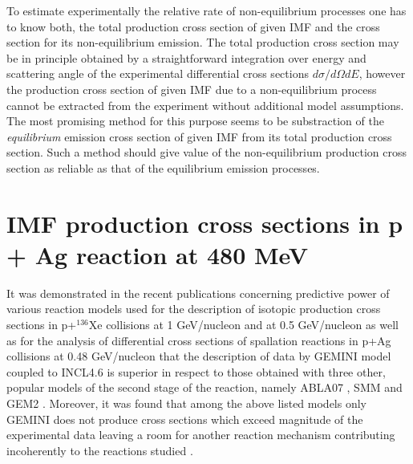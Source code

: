 To estimate experimentally the relative rate of non-equilibrium
processes one has to know both, the total production cross section
of given IMF and the cross section for its non-equilibrium emission.
The total production cross section may be in principle obtained by a
straightforward integration over energy and scattering angle of the
experimental differential cross sections $d\sigma/d\Omega dE$,
however the production cross section of given IMF due to a
non-equilibrium process cannot be extracted from the experiment
without additional model assumptions.  The most promising method for
this purpose seems to be substraction of the \emph{equilibrium}
emission cross section of given IMF  from its total production cross
section. Such a method should give value of the non-equilibrium
production cross section as reliable as that of the equilibrium
emission processes.  %
\section{IMF production cross sections in p + Ag reaction at 480 MeV}


It was demonstrated in the recent publications concerning predictive
power of various reaction models used for the description of
isotopic production cross sections in p+$^{136}$Xe collisions at 1
GeV/nucleon \cite{Singh18A} and at 0.5 GeV/nucleon \cite{Sharma17A}
as well as for the analysis of differential cross sections of
spallation reactions in p+Ag collisions at 0.48 GeV/nucleon
\cite{Sharma16A} that the description of data by GEMINI model
\cite{Charity88A,GEMINI++,Charity10A} coupled to INCL4.6
\cite{Boudard13A} is superior in respect to those obtained with
three other, popular models of the second stage of the reaction,
namely ABLA07 \cite{ABLA07}, SMM \cite{Bondorf95A} and GEM2
\cite{Furihata00A,Furihata02A}. Moreover, it was found that among
the above listed models only GEMINI does not produce cross sections
which exceed magnitude of the experimental data leaving a room for
another reaction mechanism contributing incoherently to the
reactions studied \cite{Sharma16A}.




